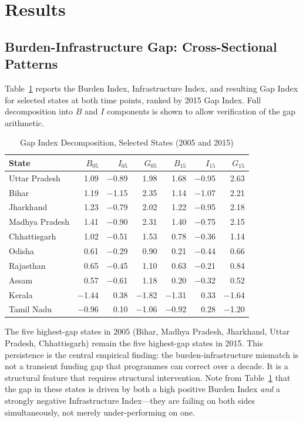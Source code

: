 \documentclass[conference]{IEEEtran}
\begin{document}
\section{Results}

\subsection{Burden-Infrastructure Gap: Cross-Sectional Patterns}

Table~\ref{tab:gap} reports the Burden Index, Infrastructure Index, and
resulting Gap Index for selected states at both time points, ranked by
2015 Gap Index. Full decomposition into $B$ and $I$ components is shown
to allow verification of the gap arithmetic.

\begin{table}[htbp]
\caption{Gap Index Decomposition, Selected States (2005 and 2015)}
\label{tab:gap}
\centering
\small
\begin{tabular}{lrrrrrr}
\toprule
State & $B_{05}$ & $I_{05}$ & $G_{05}$ & $B_{15}$ & $I_{15}$ & $G_{15}$ \\
\midrule
Uttar Pradesh   &  1.09 & $-$0.89 &  1.98 &  1.68 & $-$0.95 &  2.63 \\
Bihar           &  1.19 & $-$1.15 &  2.35 &  1.14 & $-$1.07 &  2.21 \\
Jharkhand       &  1.23 & $-$0.79 &  2.02 &  1.22 & $-$0.95 &  2.18 \\
Madhya Pradesh  &  1.41 & $-$0.90 &  2.31 &  1.40 & $-$0.75 &  2.15 \\
Chhattisgarh    &  1.02 & $-$0.51 &  1.53 &  0.78 & $-$0.36 &  1.14 \\
Odisha          &  0.61 & $-$0.29 &  0.90 &  0.21 & $-$0.44 &  0.66 \\
Rajasthan       &  0.65 & $-$0.45 &  1.10 &  0.63 & $-$0.21 &  0.84 \\
Assam           &  0.57 & $-$0.61 &  1.18 &  0.20 & $-$0.32 &  0.52 \\
Kerala          & $-$1.44 &  0.38 & $-$1.82 & $-$1.31 &  0.33 & $-$1.64 \\
Tamil Nadu      & $-$0.96 &  0.10 & $-$1.06 & $-$0.92 &  0.28 & $-$1.20 \\
\bottomrule
\end{tabular}
\end{table}

The five highest-gap states in 2005 (Bihar, Madhya Pradesh, Jharkhand,
Uttar Pradesh, Chhattisgarh) remain the five highest-gap states in 2015.
This persistence is the central empirical finding: the burden-infrastructure
mismatch is not a transient funding gap that programmes can correct
over a decade. It is a structural feature that requires structural
intervention. Note from Table~\ref{tab:gap} that the gap in these states
is driven by both a high positive Burden Index \emph{and} a strongly
negative Infrastructure Index---they are failing on both sides
simultaneously, not merely under-performing on one.
\end{document}
